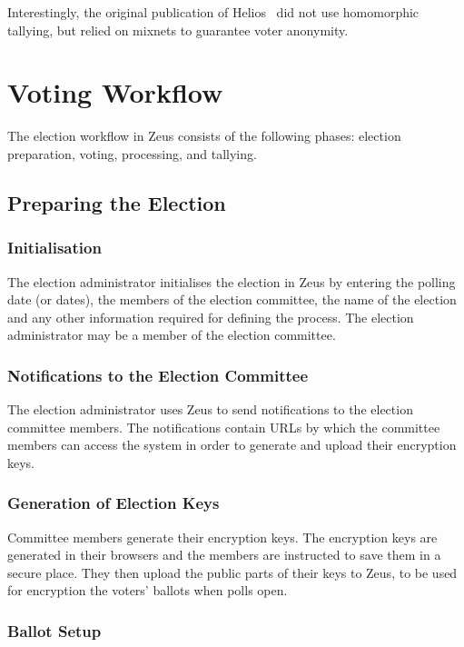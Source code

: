 \documentclass[letterpaper,twocolumn,10pt]{article}
\begin{document}
Interestingly, the original publication of Helios~\cite{adida:2008}
did not use homomorphic tallying, but relied on mixnets to
guarantee voter anonymity. ~\cite{bulens:2011}

\section{Voting Workflow}
\label{workflow}

The election workflow in Zeus consists of the following phases:
election preparation, voting, processing, and tallying.

\subsection{Preparing the Election}

\subsubsection{Initialisation}

The election administrator initialises the election in Zeus by
entering the polling date (or dates), the members of the election
committee, the name of the election and any other information required
for defining the process. The election administrator may be a member
of the election committee.

\subsubsection{Notifications to the Election Committee}

The election administrator uses Zeus to send notifications to the
election committee members. The notifications contain URLs by which
the committee members can access the system in order to generate and
upload their encryption keys.

\subsubsection{Generation of Election Keys}

Committee members generate their encryption keys. The encryption keys
are generated in their browsers and the members are instructed to save
them in a secure place. They then upload the public parts of their
keys to Zeus, to be used for encryption the voters' ballots when polls
open. 

\subsubsection{Ballot Setup}
\end{document}
